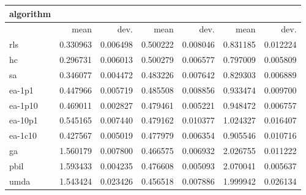 \begin{tabular}{@{}l*{6}{>{{}}N{1}{2}}@{}}
\toprule
{algorithm} &  &  &  \\
\midrule
& {mean} & {dev.} & {mean} & {dev.} & {mean} & {dev.} \\
\midrule
rls & 0.330963 & 0.006498 & 0.500222 & 0.008046 & 0.831185 & 0.012224 \\
 hc & 0.296731 & 0.006013 & 0.500279 & 0.006577 & 0.797009 & 0.005809 \\
 sa & 0.346077 & 0.004472 & 0.483226 & 0.007642 & 0.829303 & 0.006889 \\
 ea-1p1 & 0.447966 & 0.005719 & 0.485508 & 0.008856 & 0.933474 & 0.009700 \\
 ea-1p10 & 0.469011 & 0.002827 & 0.479461 & 0.005221 & 0.948472 & 0.006757 \\
 ea-10p1 & 0.545165 & 0.007440 & 0.479162 & 0.010377 & 1.024327 & 0.016407 \\
 ea-1c10 & 0.427567 & 0.005019 & 0.477979 & 0.006354 & 0.905546 & 0.010716 \\
 ga & 1.560179 & 0.007800 & 0.466575 & 0.006932 & 2.026755 & 0.011222 \\
 pbil & 1.593433 & 0.004235 & 0.476608 & 0.005093 & 2.070041 & 0.005637 \\
 umda & 1.543424 & 0.023426 & 0.456518 & 0.007886 & 1.999942 & 0.026134 \\
 \bottomrule
\end{tabular}
